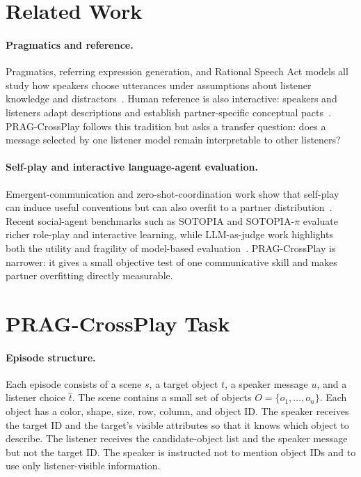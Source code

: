 \documentclass[10pt]{article}
\begin{document}
\section{Related Work}

\paragraph{Pragmatics and reference.}
Pragmatics, referring expression generation, and Rational Speech Act models all study how speakers choose utterances under assumptions about listener knowledge and distractors~\cite{grice1975logic,dale1995computational,frank2012predicting,goodman2016pragmatic}. Human reference is also interactive: speakers and listeners adapt descriptions and establish partner-specific conceptual pacts~\cite{clark1986referring,brennan1996conceptual}. PRAG-CrossPlay follows this tradition but asks a transfer question: does a message selected by one listener model remain interpretable to other listeners?

\paragraph{Self-play and interactive language-agent evaluation.}
Emergent-communication and zero-shot-coordination work show that self-play can induce useful conventions but can also overfit to a partner distribution~\cite{foerster2016learning,lazaridou2017multiagent,carroll2019utility,hu2020otherplay,lucas2022anyplay}. Recent social-agent benchmarks such as SOTOPIA and SOTOPIA-$\pi$ evaluate richer role-play and interactive learning, while LLM-as-judge work highlights both the utility and fragility of model-based evaluation~\cite{zhou2023sotopia,wang2024sotopiapi,zheng2023judging}. PRAG-CrossPlay is narrower: it gives a small objective test of one communicative skill and makes partner overfitting directly measurable.
\section{PRAG-CrossPlay Task}

\paragraph{Episode structure.}
Each episode consists of a scene $s$, a target object $t$, a speaker message $u$, and a listener choice $\hat{t}$. The scene contains a small set of objects $O=\{o_1,\ldots,o_n\}$. Each object has a color, shape, size, row, column, and object ID. The speaker receives the target ID and the target's visible attributes so that it knows which object to describe. The listener receives the candidate-object list and the speaker message but not the target ID. The speaker is instructed not to mention object IDs and to use only listener-visible information.
\end{document}
